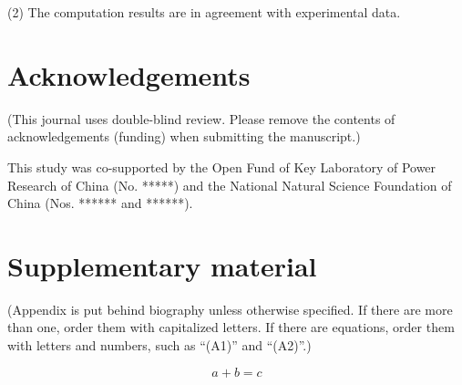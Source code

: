 \documentclass{cja}
\begin{document}
(2) The computation results are in agreement with experimental data.



\section*{Acknowledgements}

\begin{instructions}
  (This journal uses double-blind review.
  Please remove the contents of acknowledgements (funding) when submitting the manuscript.)
\end{instructions}

This study was co-supported by the Open Fund of Key Laboratory of Power Research of China (No. *****) and the National Natural Science Foundation of China (Nos. ****** and ******).



\nocite{*}









\appendix

\section{Supplementary material}
\label{sec:supp}

\begin{instructions}
  (Appendix is put behind biography unless otherwise specified.
  If there are more than one, order them with capitalized letters.
  If there are equations, order them with letters and numbers, such as ``(A1)'' and ``(A2)''.)
\end{instructions}

\begin{equation}
  a + b = c
\end{equation}
\end{document}
